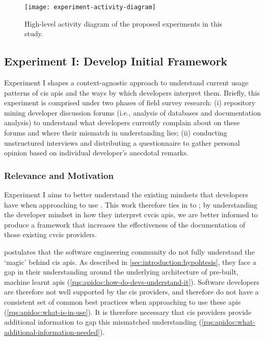 \begin{figure}[t!]
  \centering
  \texttt{[image: experiment-activity-diagram]}
  \caption[High-level overview of the proposed experiments]{High-level activity diagram of the proposed experiments in this study.}
  \label{fig:research-methodology:review:activity-diagram}
\end{figure}


\subsection{Experiment I: Develop Initial Framework}
\label{ssec:research-methodology:experiments:1}

Experiment I shapes a context-agnostic approach to understand current usage patterns of \gls{cis} \glspl{api} and the ways by which developers interpret them. Briefly, this experiment is comprised under two phases of field survey research: (i) repository mining developer discussion forums (i.e., analysis of databases and documentation analysis) to understand what developers currently complain about on these forums and where their mismatch in understanding lies; (ii) conducting unstructured interviews and distributing a questionnaire to gather personal opinion based on individual developer's anecdotal remarks.

\subsubsection{Relevance and Motivation}

Experiment I aims to better understand the existing mindsets that developers have when approaching to use . This work therefore ties in to ; by understanding the developer mindset in how they interpret \gls{cvcis} \glspl{api}, we are better informed to produce a framework that increases the effectiveness of the documentation of those existing \gls{cvcis} providers.

 postulates that the software engineering community do not fully understand the `magic' behind \gls{cis} \glspl{api}. As described in \cref{sec:introduction:hypohtesis}, they face a gap in their understanding around the underlying architecture of pre-built, machine learnt \glspl{api} (\ref{rqs:apidoc:how-do-devs-understand-it}). Software developers are therefore not well supported by the \gls{cis} providers, and therefore do not have a consistent set of common best practices when approaching to use these \glspl{api} (\ref{rqs:apidoc:what-is-in-use}). It is therefore necessary that \gls{cis} providers provide additional information to gap this mismatched understanding (\ref{rqs:apidoc:what-additional-information-needed}). 

